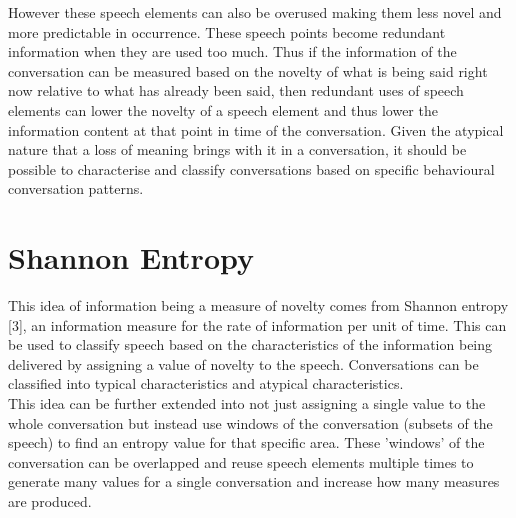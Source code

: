 
However these speech elements can also be overused making them less novel and more predictable in occurrence. These speech points become redundant information when they are used too much. Thus if the information of the conversation can be measured based on the novelty of what is being said right now relative to what has already been said, then redundant uses of speech elements can lower the novelty of a speech element and thus lower the information content at that point in time of the conversation. Given the atypical nature that a loss of meaning brings with it in a conversation, it should be possible to characterise and classify conversations based on specific behavioural conversation patterns. 

\section{Shannon Entropy}
This idea of information being a measure of novelty comes from Shannon entropy [3], an information measure for the rate of information per unit of time. This can be used to classify speech based on the characteristics of the information being delivered by assigning a value of novelty to the speech. Conversations can be classified into typical characteristics and atypical characteristics.\\


This idea can be further extended into not just assigning a single value to the whole conversation but instead use windows of the conversation (subsets of the speech) to find an entropy value for that specific area. These 'windows' of the conversation can be overlapped and reuse speech elements multiple times to generate many values for a single conversation and increase how many measures are produced. \\

